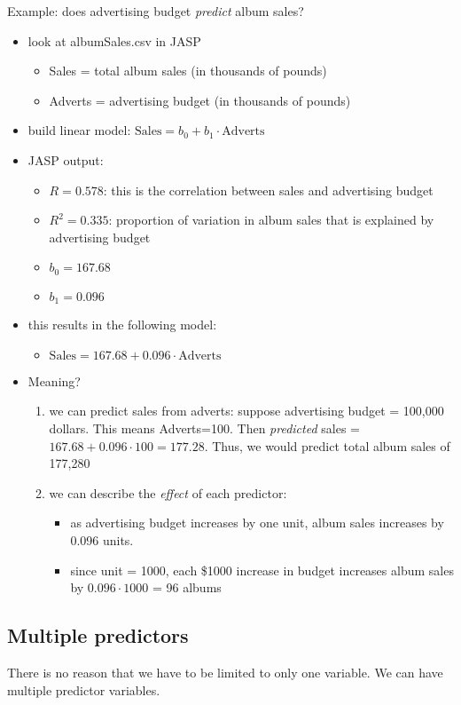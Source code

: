 \documentclass[11pt]{article}
\begin{document}
Example: does advertising budget \emph{predict} album sales?
\begin{itemize}
\item look at albumSales.csv in JASP
\begin{itemize}
\item Sales = total album sales (in thousands of pounds)
\item Adverts = advertising budget (in thousands of pounds)
\end{itemize}
\item build linear model: $\text{Sales} = b_0 + b_1\cdot \text{Adverts}$
\item JASP output:
\begin{itemize}
\item $R = 0.578$: this is the correlation between sales and advertising budget
\item $R^2 = 0.335$: proportion of variation in album sales that is explained by advertising budget
\item $b_0 = 167.68$
\item $b_1 = 0.096$
\end{itemize}
\item this results in the following model:
\begin{itemize}
\item $\text{Sales} = 167.68 + 0.096\cdot\text{Adverts}$
\end{itemize}
\item Meaning?
\begin{enumerate}
\item we can predict sales from adverts: suppose advertising budget = 100,000 dollars.  This means Adverts=100.  Then \emph{predicted} sales = $167.68+0.096\cdot 100=177.28$.  Thus, we would predict total album sales of 177,280
\item we can describe the \emph{effect} of each predictor:
\begin{itemize}
\item as advertising budget increases by one unit, album sales increases by 0.096 units.
\item since unit = 1000, each \$1000 increase in budget increases album sales by $0.096\cdot 1000$ = 96 albums
\end{itemize}
\end{enumerate}
\end{itemize}

\subsection*{Multiple predictors}
\label{sec-3-2}
There is no reason that we have to be limited to only one variable.  We can have multiple predictor variables.
\end{document}
